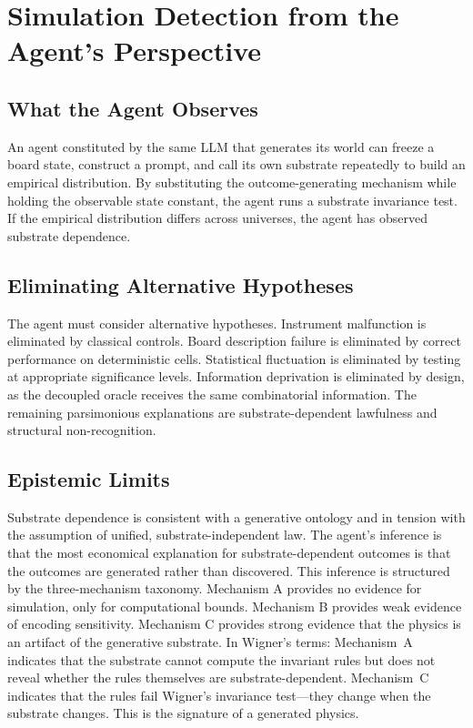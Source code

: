\documentclass[12pt,a4paper]{article}
\begin{document}
\section{Simulation Detection from the Agent's Perspective}
\label{sec:simulation}

\subsection{What the Agent Observes}
\label{sec:agent_observes}

An agent constituted by the same LLM that generates its world can freeze a board state, construct a prompt, and call its own substrate repeatedly to build an empirical distribution. By substituting the outcome-generating mechanism while holding the observable state constant, the agent runs a substrate invariance test. If the empirical distribution differs across universes, the agent has observed substrate dependence.

\subsection{Eliminating Alternative Hypotheses}
\label{sec:hypotheses}

The agent must consider alternative hypotheses. Instrument malfunction is eliminated by classical controls. Board description failure is eliminated by correct performance on deterministic cells. Statistical fluctuation is eliminated by testing at appropriate significance levels. Information deprivation is eliminated by design, as the decoupled oracle receives the same combinatorial information. The remaining parsimonious explanations are substrate-dependent lawfulness and structural non-recognition.

\subsection{Epistemic Limits}
\label{sec:epistemic}

Substrate dependence is consistent with a generative ontology and in tension with the assumption of unified, substrate-independent law. The agent's inference is that the most economical explanation for substrate-dependent outcomes is that the outcomes are generated rather than discovered. This inference is structured by the three-mechanism taxonomy. Mechanism A provides no evidence for simulation, only for computational bounds. Mechanism B provides weak evidence of encoding sensitivity. Mechanism C provides strong evidence that the physics is an artifact of the generative substrate. In Wigner's terms: Mechanism~A indicates that the substrate cannot compute the invariant rules but does not reveal whether the rules themselves are substrate-dependent. Mechanism~C indicates that the rules fail Wigner's invariance test---they change when the substrate changes. This is the signature of a generated physics.
\end{document}

